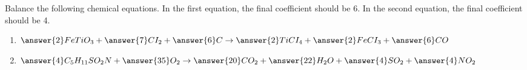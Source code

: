 \documentclass{ximera}
\author{Zack Reed}
\begin{document}
\begin{exercise}

Balance the following chemical equations. In the first equation, the final coefficient should be 6. In the second equation, the final coefficient should be 4.

\begin{enumerate}

    \item $\answer{2}FeTiO_3+\answer{7}CI_2+\answer{6}C\rightarrow \answer{2}TiCI_4+\answer{2}FeCI_3+\answer{6}CO$

    
    
    \item $\answer{4}C_5H_{11}SO_2N+\answer{35}O_2\rightarrow \answer{20}CO_2+\answer{22}H_2O+\answer{4}SO_2+\answer{4}NO_2$

\end{enumerate}

\end{exercise}
\end{document}

